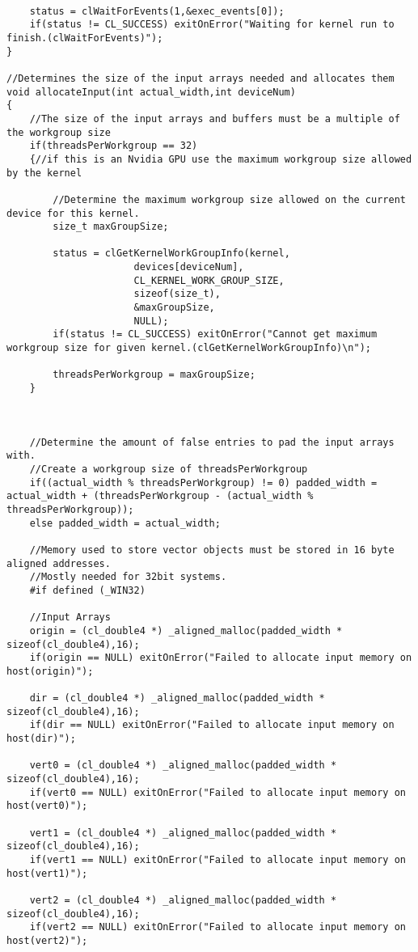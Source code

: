 \begin{verbatim}
	
	status = clWaitForEvents(1,&exec_events[0]);
	if(status != CL_SUCCESS) exitOnError("Waiting for kernel run to finish.(clWaitForEvents)");
}

//Determines the size of the input arrays needed and allocates them
void allocateInput(int actual_width,int deviceNum)
{
	//The size of the input arrays and buffers must be a multiple of the workgroup size
	if(threadsPerWorkgroup == 32)
	{//if this is an Nvidia GPU use the maximum workgroup size allowed by the kernel
	  
	    //Determine the maximum workgroup size allowed on the current device for this kernel.
	    size_t maxGroupSize;
      
	    status = clGetKernelWorkGroupInfo(kernel, 
					  devices[deviceNum], 
					  CL_KERNEL_WORK_GROUP_SIZE,
					  sizeof(size_t),
					  &maxGroupSize, 
					  NULL);
	    if(status != CL_SUCCESS) exitOnError("Cannot get maximum workgroup size for given kernel.(clGetKernelWorkGroupInfo)\n");
	
	    threadsPerWorkgroup = maxGroupSize;
	}


	    
	//Determine the amount of false entries to pad the input arrays with.
	//Create a workgroup size of threadsPerWorkgroup 
	if((actual_width % threadsPerWorkgroup) != 0) padded_width = actual_width + (threadsPerWorkgroup - (actual_width % threadsPerWorkgroup));
	else padded_width = actual_width;
	
	//Memory used to store vector objects must be stored in 16 byte aligned addresses.
	//Mostly needed for 32bit systems.
	#if defined (_WIN32)
	
	//Input Arrays
	origin = (cl_double4 *) _aligned_malloc(padded_width * sizeof(cl_double4),16);
	if(origin == NULL) exitOnError("Failed to allocate input memory on host(origin)");

	dir = (cl_double4 *) _aligned_malloc(padded_width * sizeof(cl_double4),16);
	if(dir == NULL) exitOnError("Failed to allocate input memory on host(dir)");

	vert0 = (cl_double4 *) _aligned_malloc(padded_width * sizeof(cl_double4),16);
	if(vert0 == NULL) exitOnError("Failed to allocate input memory on host(vert0)");

	vert1 = (cl_double4 *) _aligned_malloc(padded_width * sizeof(cl_double4),16);
	if(vert1 == NULL) exitOnError("Failed to allocate input memory on host(vert1)");

	vert2 = (cl_double4 *) _aligned_malloc(padded_width * sizeof(cl_double4),16);
	if(vert2 == NULL) exitOnError("Failed to allocate input memory on host(vert2)");


\end{verbatim}
